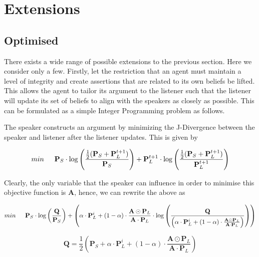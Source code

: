 \section{Extensions}

\subsection{Optimised}
There exists a wide range of possible extensions to the previous section. Here we consider only a few. Firstly, let  the restriction that an agent must maintain a level of integrity and create assertions that are related to its own beliefs be lifted. This allows the agent to tailor its argument to the listener such that the listener will update its set of beliefs to align with the speakers as closely as possible. This can be formulated as a simple Integer Programming problem as follows. 

The speaker constructs an argument by minimizing the J-Divergence between the speaker and listener after the listener updates. This is given by

\begin{equation}
    min \hspace{1.5em} \mathbf{P}_S \cdot \log \left( \frac{\frac{1}{2} (\mathbf{P}_S  + \mathbf{P}_L^{t+1}) }{\mathbf{P}_S} \right) +  \mathbf{P}_L^{t+1} \cdot \log \left( \frac{\frac{1}{2} (\mathbf{P}_S  + \mathbf{P}_L^{t+1}) }{\mathbf{P}_L^{t+1}} \right) 
\end{equation} 

Clearly, the only variable that the speaker can influence in order to minimise this objective function is $\mathbf{A}$, hence, we can rewrite the above as

\begin{equation}
    min \hspace{1.5em}\mathbf{P}_S \cdot \log \left( \frac{\mathbf{Q}}{\mathbf{P}_S} \right) +  \left( \alpha \cdot \mathbf{P}^{i}_L + (1 - \alpha) \cdot  \frac{\mathbf{A} \odot \mathbf{P}_L}{\mathbf{A} \cdot \mathbf{P}_L} \cdot \log \left( \frac{\mathbf{Q}}{ \left( \alpha \cdot \mathbf{P}^{i}_L + (1 - \alpha) \cdot  \frac{\mathbf{A} \odot \mathbf{P}_L}{\mathbf{A} \cdot \mathbf{P}_L} \right)  } \right) \right)
\end{equation} 

\begin{equation}
    \mathbf{Q} = \frac{1}{ 2} \left(\mathbf{P}_S  +  \alpha \cdot \mathbf{P}^{i}_L + (1 - \alpha) \cdot  \frac{\mathbf{A} \odot \mathbf{P}_L}{\mathbf{A} \cdot \mathbf{P}_L} \right)
\end{equation}

